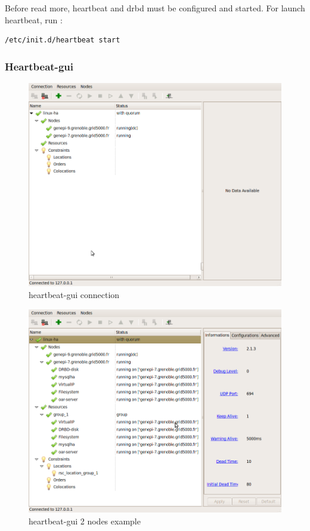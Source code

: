 \documentclass[a4paper,10pt]{report}
\begin{document}
Before read more, heartbeat and drbd must be configured and started. For launch heartbeat, run :
\begin{lstlisting}
/etc/init.d/heartbeat start
\end{lstlisting}


\subsubsection{Heartbeat-gui}

\begin{figure}
\includegraphics[scale=0.5]{schema/hb_gui-2nodes-connect.png}
\caption{heartbeat-gui connection} 
\label{hb-gui-connect} 
\end{figure}

\begin{figure}
\includegraphics[scale=0.5]{schema/hb_gui-2nodes.png}
\caption{heartbeat-gui 2 nodes example} 
\label{hb-gui-2nodes} 
\end{figure}
\end{document}
